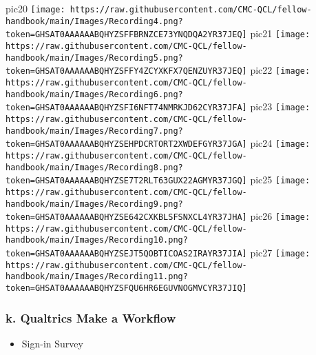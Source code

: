 \documentclass[
]{book}
\providecommand{\tightlist}{%
  \setlength{\itemsep}{0pt}\setlength{\parskip}{0pt}}
\begin{document}
pic20
\texttt{[image: https://raw.githubusercontent.com/CMC-QCL/fellow-handbook/main/Images/Recording4.png?token=GHSAT0AAAAAABQHYZSFFBRNZCE73YNQDQA2YR37JEQ]}
pic21
\texttt{[image: https://raw.githubusercontent.com/CMC-QCL/fellow-handbook/main/Images/Recording5.png?token=GHSAT0AAAAAABQHYZSFFY4ZCYXKFX7QENZUYR37JEQ]}
pic22
\texttt{[image: https://raw.githubusercontent.com/CMC-QCL/fellow-handbook/main/Images/Recording6.png?token=GHSAT0AAAAAABQHYZSFI6NFT74NMRKJD62CYR37JFA]}
pic23
\texttt{[image: https://raw.githubusercontent.com/CMC-QCL/fellow-handbook/main/Images/Recording7.png?token=GHSAT0AAAAAABQHYZSEHPDCRTORT2XWDEFGYR37JGA]}
pic24
\texttt{[image: https://raw.githubusercontent.com/CMC-QCL/fellow-handbook/main/Images/Recording8.png?token=GHSAT0AAAAAABQHYZSE7T2RLT63GUX22AGMYR37JGQ]}
pic25
\texttt{[image: https://raw.githubusercontent.com/CMC-QCL/fellow-handbook/main/Images/Recording9.png?token=GHSAT0AAAAAABQHYZSE642CXKBLSFSNXCL4YR37JHA]}
pic26
\texttt{[image: https://raw.githubusercontent.com/CMC-QCL/fellow-handbook/main/Images/Recording10.png?token=GHSAT0AAAAAABQHYZSEJT5QOBTICOAS2IRAYR37JIA]}
pic27
\texttt{[image: https://raw.githubusercontent.com/CMC-QCL/fellow-handbook/main/Images/Recording11.png?token=GHSAT0AAAAAABQHYZSFQU6HR6EGUVNOGMVCYR37JIQ]}

\hypertarget{k.-qualtrics-make-a-workflow}{%
\subsubsection{\texorpdfstring{k. Qualtrics Make a Workflow }{k. Qualtrics Make a Workflow }}\label{k.-qualtrics-make-a-workflow}}

\begin{itemize}
\tightlist
\item
  Sign-in Survey
\end{itemize}
\end{document}
